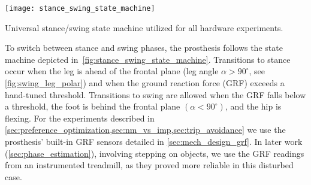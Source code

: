 \begin{marginfigure}
    \centering
    \texttt{[image: stance\_swing\_state\_machine]}
    \caption{Universal stance/swing state machine utilized for all hardware
    experiments.}\label{fig:stance_swing_state_machine}
\end{marginfigure} 
To switch between stance and swing phases, the prosthesis follows the state
machine depicted in~\cref{fig:stance_swing_state_machine}.  Transitions to
stance occur when the leg is ahead of the frontal plane (leg angle $\alpha >
90^\circ$, see \cref{fig:swing_leg_polar}) and when the ground reaction force
(GRF) exceeds a hand-tuned threshold. Transitions to swing are allowed when the
GRF falls below a threshold, the foot is behind the frontal plane $(\alpha <
90^\circ)$, and the hip is flexing. For the experiments described in
\cref{sec:preference_optimization,sec:nm_vs_imp,sec:trip_avoidance} we use the
prosthesis' built-in GRF sensors detailed in \cref{sec:mech_design_grf}. In
later work (\cref{sec:phase_estimation}), involving stepping on objects, we use
the GRF readings from an instrumented treadmill, as they proved more reliable in
this disturbed case.
